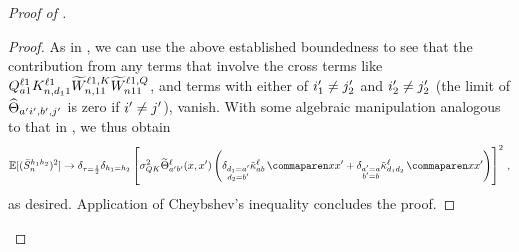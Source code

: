 \begin{proof}[Proof of ]
\begin{proof}
        As in , we can use the above established boundedness to see that the contribution from any terms that involve the cross terms like $Q_{a 1}^{\ell 1} K_{n, d_1 1}^{\ell 1} \widetilde{W}_{n, 1 1}^{\ell 1 , K}
        \widetilde{W}_{n 1 1}^{\ell 1, Q}$, and terms with either of $i'_1 \neq j'_2$ and $i'_2 \neq j'_2$ (the limit of $\widehat{\Theta}_{a' i', b', j'}$ is zero if $i' \neq j'$), vanish.
        With some algebraic manipulation analogous to that in , we thus obtain 
        $$
            \E [ (\generalMean_{\sequenceVariable}^{\headIndex_1 \headIndex_2})^2 ] 
            \to
            \delta_{\scaling = \frac{1}{2}}
            \delta_{\headIndex_1 = \headIndex_2}
            \left[
                \QKVar
                \ntktilde_{\gIndexA \gIndexB}^{\depthSymbol}(\inputSymbol, \inputSymbol')
                \left( 
                    \delta_{\substack{d_1 = \gIndexA \\ d_2 = \gIndexB}}
                    \kerntildef{\fIndexA \fIndexB}{\depthSymbol}{\inputSymbol}{\inputSymbol'}
                    +
                    \delta_{\substack{\gIndexA = \fIndexA \\ \gIndexB = \fIndexB}}
                    \kerntildef{d_1 d_2}{\depthSymbol}{\inputSymbol}{\inputSymbol'}
                \right)
            \right]^2
            \, ,
        $$
        as desired.
        Application of Cheybshev's inequality concludes the proof.
    \end{proof}
    

\end{proof}
